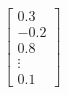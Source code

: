 \documentclass[preview]{standalone}
\begin{document}
\begin{align*}
\begin{bmatrix} 0.3 \\ -0.2 \\ 0.8 \\ \vdots \\ 0.1 \end{bmatrix}
\end{align*}
\end{document}

